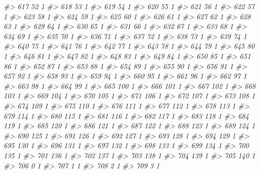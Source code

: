 \documentclass[]{article}
\newenvironment{Shaded}{\begin{snugshade}}{\end{snugshade}}
\newcommand{\CommentTok}[1]{\textcolor[rgb]{0.56,0.35,0.01}{\textit{#1}}}
\begin{document}
\begin{Shaded}
\begin{Highlighting}[]
\CommentTok{#> 617   52  1}
\CommentTok{#> 618   53  1}
\CommentTok{#> 619   54  1}
\CommentTok{#> 620   55  1}
\CommentTok{#> 621   56  1}
\CommentTok{#> 622   57  1}
\CommentTok{#> 623   58  1}
\CommentTok{#> 624   59  1}
\CommentTok{#> 625   60  1}
\CommentTok{#> 626   61  1}
\CommentTok{#> 627   62  1}
\CommentTok{#> 628   63  1}
\CommentTok{#> 629   64  1}
\CommentTok{#> 630   65  1}
\CommentTok{#> 631   66  1}
\CommentTok{#> 632   67  1}
\CommentTok{#> 633   68  1}
\CommentTok{#> 634   69  1}
\CommentTok{#> 635   70  1}
\CommentTok{#> 636   71  1}
\CommentTok{#> 637   72  1}
\CommentTok{#> 638   73  1}
\CommentTok{#> 639   74  1}
\CommentTok{#> 640   75  1}
\CommentTok{#> 641   76  1}
\CommentTok{#> 642   77  1}
\CommentTok{#> 643   78  1}
\CommentTok{#> 644   79  1}
\CommentTok{#> 645   80  1}
\CommentTok{#> 646   81  1}
\CommentTok{#> 647   82  1}
\CommentTok{#> 648   83  1}
\CommentTok{#> 649   84  1}
\CommentTok{#> 650   85  1}
\CommentTok{#> 651   86  1}
\CommentTok{#> 652   87  1}
\CommentTok{#> 653   88  1}
\CommentTok{#> 654   89  1}
\CommentTok{#> 655   90  1}
\CommentTok{#> 656   91  1}
\CommentTok{#> 657   92  1}
\CommentTok{#> 658   93  1}
\CommentTok{#> 659   94  1}
\CommentTok{#> 660   95  1}
\CommentTok{#> 661   96  1}
\CommentTok{#> 662   97  1}
\CommentTok{#> 663   98  1}
\CommentTok{#> 664   99  1}
\CommentTok{#> 665  100  1}
\CommentTok{#> 666  101  1}
\CommentTok{#> 667  102  1}
\CommentTok{#> 668  103  1}
\CommentTok{#> 669  104  1}
\CommentTok{#> 670  105  1}
\CommentTok{#> 671  106  1}
\CommentTok{#> 672  107  1}
\CommentTok{#> 673  108  1}
\CommentTok{#> 674  109  1}
\CommentTok{#> 675  110  1}
\CommentTok{#> 676  111  1}
\CommentTok{#> 677  112  1}
\CommentTok{#> 678  113  1}
\CommentTok{#> 679  114  1}
\CommentTok{#> 680  115  1}
\CommentTok{#> 681  116  1}
\CommentTok{#> 682  117  1}
\CommentTok{#> 683  118  1}
\CommentTok{#> 684  119  1}
\CommentTok{#> 685  120  1}
\CommentTok{#> 686  121  1}
\CommentTok{#> 687  122  1}
\CommentTok{#> 688  123  1}
\CommentTok{#> 689  124  1}
\CommentTok{#> 690  125  1}
\CommentTok{#> 691  126  1}
\CommentTok{#> 692  127  1}
\CommentTok{#> 693  128  1}
\CommentTok{#> 694  129  1}
\CommentTok{#> 695  130  1}
\CommentTok{#> 696  131  1}
\CommentTok{#> 697  132  1}
\CommentTok{#> 698  133  1}
\CommentTok{#> 699  134  1}
\CommentTok{#> 700  135  1}
\CommentTok{#> 701  136  1}
\CommentTok{#> 702  137  1}
\CommentTok{#> 703  138  1}
\CommentTok{#> 704  139  1}
\CommentTok{#> 705  140  1}
\CommentTok{#> 706    0  1}
\CommentTok{#> 707    1  1}
\CommentTok{#> 708    2  1}
\CommentTok{#> 709    3  1}

\end{Highlighting}
\end{Shaded}
\end{document}
